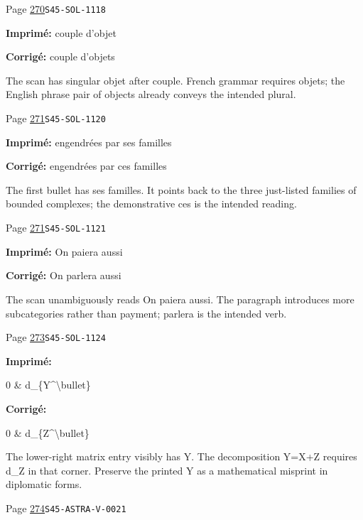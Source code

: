 \begin{description}
\smallskip
\item[\hypertarget{apparatus:FR-0278}{278}] Page \hyperlink{printpage:fr:270}{270}\quad\texttt{S45-SOL-1118}
\par\noindent\textbf{Imprimé:} couple d'objet
\par\noindent\textbf{Corrigé:} couple d'objets
\par\noindent The scan has singular objet after couple. French grammar requires objets; the English phrase pair of objects already conveys the intended plural.
\smallskip
\item[\hypertarget{apparatus:FR-0279}{279}] Page \hyperlink{printpage:fr:271}{271}\quad\texttt{S45-SOL-1120}
\par\noindent\textbf{Imprimé:} engendrées par ses familles
\par\noindent\textbf{Corrigé:} engendrées par ces familles
\par\noindent The first bullet has ses familles. It points back to the three just-listed families of bounded complexes; the demonstrative ces is the intended reading.
\smallskip
\item[\hypertarget{apparatus:FR-0280}{280}] Page \hyperlink{printpage:fr:271}{271}\quad\texttt{S45-SOL-1121}
\par\noindent\textbf{Imprimé:} On paiera aussi
\par\noindent\textbf{Corrigé:} On parlera aussi
\par\noindent The scan unambiguously reads On paiera aussi. The paragraph introduces more subcategories rather than payment; parlera is the intended verb.
\smallskip
\item[\hypertarget{apparatus:FR-0281}{281}] Page \hyperlink{printpage:fr:273}{273}\quad\texttt{S45-SOL-1124}
\par\noindent\textbf{Imprimé:} {\footnotesize\ttfamily\raggedright 0 \& d\_\allowbreak{}\{\allowbreak{}Y\textasciicircum{}\allowbreak{}\textbackslash{}\allowbreak{}bullet\}\allowbreak{}}
\par\noindent\textbf{Corrigé:} {\footnotesize\ttfamily\raggedright 0 \& d\_\allowbreak{}\{\allowbreak{}Z\textasciicircum{}\allowbreak{}\textbackslash{}\allowbreak{}bullet\}\allowbreak{}}
\par\noindent The lower-right matrix entry visibly has Y. The decomposition Y=X+Z requires d\_Z in that corner. Preserve the printed Y as a mathematical misprint in diplomatic forms.
\smallskip
\item[\hypertarget{apparatus:FR-0282}{282}] Page \hyperlink{printpage:fr:274}{274}\quad\texttt{S45-ASTRA-V-0021}

\end{description}
